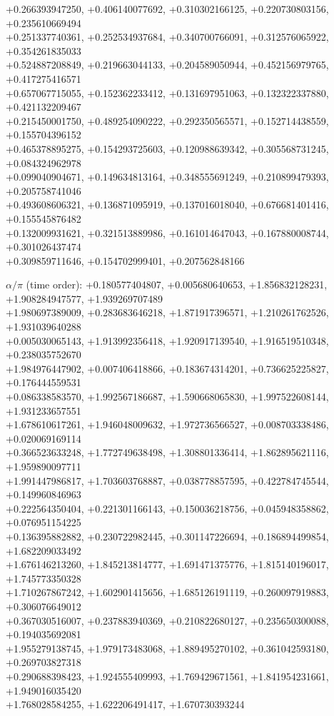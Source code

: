 \begin{flushleft}
+0.266393947250, +0.406140077692, +0.310302166125, +0.220730803156, +0.235610669494 \\
+0.251337740361, +0.252534937684, +0.340700766091, +0.312576065922, +0.354261835033 \\
+0.524887208849, +0.219663044133, +0.204589050944, +0.452156979765, +0.417275416571 \\
+0.657067715055, +0.152362233412, +0.131697951063, +0.132322337880, +0.421132209467 \\
+0.215450001750, +0.489254090222, +0.292350565571, +0.152714438559, +0.155704396152 \\
+0.465378895275, +0.154293725603, +0.120988639342, +0.305568731245, +0.084324962978 \\
+0.099040904671, +0.149634813164, +0.348555691249, +0.210899479393, +0.205758741046 \\
+0.493608606321, +0.136871095919, +0.137016018040, +0.676681401416, +0.155545876482 \\
+0.132009931621, +0.321513889986, +0.161014647043, +0.167880008744, +0.301026437474 \\
+0.309859711646, +0.154702999401, +0.207562848166
\par\noindent$\alpha/\pi$ (time order):
+0.180577404807, +0.005680640653, +1.856832128231, +1.908284947577, +1.939269707489 \\
+1.980697389009, +0.283683646218, +1.871917396571, +1.210261762526, +1.931039640288 \\
+0.005030065143, +1.913992356418, +1.920917139540, +1.916519510348, +0.238035752670 \\
+1.984976447902, +0.007406418866, +0.183674314201, +0.736625225827, +0.176444559531 \\
+0.086338583570, +1.992567186687, +1.590668065830, +1.997522608144, +1.931233657551 \\
+1.678610617261, +1.946048009632, +1.972736566527, +0.008703338486, +0.020069169114 \\
+0.366523633248, +1.772749638498, +1.308801336414, +1.862895621116, +1.959890097711 \\
+1.991447986817, +1.703603768887, +0.038778857595, +0.422784745544, +0.149960846963 \\
+0.222564350404, +0.221301166143, +0.150036218756, +0.045948358862, +0.076951154225 \\
+0.136395882882, +0.230722982445, +0.301147226694, +0.186894499854, +1.682209033492 \\
+1.676146213260, +1.845213814777, +1.691471375776, +1.815140196017, +1.745773350328 \\
+1.710267867242, +1.602901415656, +1.685126191119, +0.260097919883, +0.306076649012 \\
+0.367030516007, +0.237883940369, +0.210822680127, +0.235650300088, +0.194035692081 \\
+1.955279138745, +1.979173483068, +1.889495270102, +0.361042593180, +0.269703827318 \\
+0.290688398423, +1.924555409993, +1.769429671561, +1.841954231661, +1.949016035420 \\
+1.768028584255, +1.622206491417, +1.670730393244
\end{flushleft}
